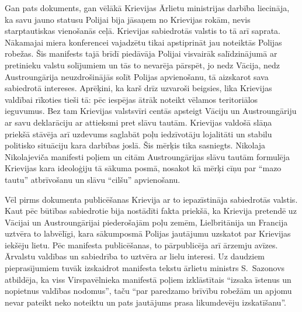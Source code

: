 \documentclass[twoside,a5paper,12pt,fleqn,openany]{extbook}
\begin{document}
Gan pats dokuments, gan vēlākā Krievijas Ārlietu ministrijas darbība liecināja, ka savu jauno statusu Polijai bija jāsaņem no Krievijas rokām, nevis starptautiskas vienošanās ceļā. Krievijas sabiedrotās valstis to tā arī saprata. Nākamajai miera konferencei vajadzētu tikai apstiprināt jau noteiktās Polijas robežas. Šis manifests tajā brīdī piedāvāja Polijai visvairāk salīdzinājumā ar pretinieku valstu solījumiem un tās to nevarēja pārspēt, jo nedz Vācija, nedz Austroungārija neuzdrošinājās solīt Polijas apvienošanu, tā aizskarot sava sabiedrotā intereses. Aprēķini, ka karš drīz uzvaroši beigsies, lika Krievijas valdībai rīkoties tieši tā: pēc iespējas ātrāk noteikt vēlamos teritoriālos ieguvumus. Bez tam Krievijas valstsvīri centās apsteigt Vāciju un Austroungāriju ar savu deklarāciju ar attieksmi pret slāvu tautām. Krievijas valdošā slāņa priekšā stāvēja arī uzdevums saglabāt poļu iedzīvotāju lojalitāti un stabilu politisko situāciju kara darbības joslā. Šis mērķis tika sasniegts. Nikolaja Nikolajeviča manifesti poļiem un citām Austroungārijas slāvu tautām formulēja Krievijas kara ideoloģiju tā sākuma posmā, nosakot kā mērķi cīņu par ``mazo tautu'' atbrīvošanu un slāvu ``cilšu'' apvienošanu.

Vēl pirms dokumenta publicēšanas Krievija ar to iepazīstināja sabiedrotās valstis. Kaut pēc būtības sabiedrotie bija nostādīti fakta priekšā, ka Krievija pretendē uz Vācijai un Austroungārijai piederošajām poļu zemēm, Lielbritānija un Francija uztvēra to labvēlīgi, kara sākumposmā Polijas jautājumu uzskatot par Krievijas iekšēju lietu. Pēc manifesta publicēšanas, to pārpublicēja arī ārzemju avīzes. Ārvalstu valdības un sabiedrība to uztvēra ar lielu interesi. Uz daudziem pieprasījumiem tuvāk izskaidrot manifesta tekstu ārlietu ministrs S.~Sazonovs atbildēja, ka viss Virspavēlnieka manifestā poļiem izklāstītais ``izsaka īstenus un nopietnus valdības nodomus'', taču ``par paredzamo brīvību robežām un apjomu nevar pateikt neko noteiktu un pats jautājums prasa likumdevēju izskatīšanu''.
\end{document}
